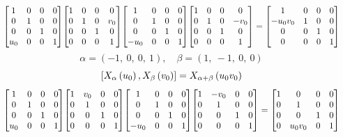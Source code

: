 \documentclass[11pt]{article}
\theoremstyle{definition}
\begin{document}
\[
\scaletoalign{\textwidth}{{\left[\begin{matrix}1 & 0 & 0 & 0\\0 & 1 & 0 & 0\\0 & 0 & 1 & 0\\u_{0} & 0 & 0 & 1\end{matrix}\right]} {\left[\begin{matrix}1 & 0 & 0 & 0\\0 & 1 & 0 & v_{0}\\0 & 0 & 1 & 0\\0 & 0 & 0 & 1\end{matrix}\right]} {\left[\begin{matrix}1 & 0 & 0 & 0\\0 & 1 & 0 & 0\\0 & 0 & 1 & 0\\- u_{0} & 0 & 0 & 1\end{matrix}\right]} {\left[\begin{matrix}1 & 0 & 0 & 0\\0 & 1 & 0 & - v_{0}\\0 & 0 & 1 & 0\\0 & 0 & 0 & 1\end{matrix}\right]} = {\left[\begin{matrix}1 & 0 & 0 & 0\\- u_{0} v_{0} & 1 & 0 & 0\\0 & 0 & 1 & 0\\0 & 0 & 0 & 1\end{matrix}\right]}}
\]
\[
\alpha = \left( -1, \  0, \  0, \  1\right), \quad \beta = \left( 1, \  -1, \  0, \  0\right)
\]
\[
\scaletoalign{\textwidth}{\left[ X_{\alpha}\left(u_{0}\right), X_{\beta}\left(v_{0}\right) \right] = X_{\alpha + \beta}\left(u_{0} v_{0}\right)}
\]
\[
\scaletoalign{\textwidth}{{\left[\begin{matrix}1 & 0 & 0 & 0\\0 & 1 & 0 & 0\\0 & 0 & 1 & 0\\u_{0} & 0 & 0 & 1\end{matrix}\right]} {\left[\begin{matrix}1 & v_{0} & 0 & 0\\0 & 1 & 0 & 0\\0 & 0 & 1 & 0\\0 & 0 & 0 & 1\end{matrix}\right]} {\left[\begin{matrix}1 & 0 & 0 & 0\\0 & 1 & 0 & 0\\0 & 0 & 1 & 0\\- u_{0} & 0 & 0 & 1\end{matrix}\right]} {\left[\begin{matrix}1 & - v_{0} & 0 & 0\\0 & 1 & 0 & 0\\0 & 0 & 1 & 0\\0 & 0 & 0 & 1\end{matrix}\right]} = {\left[\begin{matrix}1 & 0 & 0 & 0\\0 & 1 & 0 & 0\\0 & 0 & 1 & 0\\0 & u_{0} v_{0} & 0 & 1\end{matrix}\right]}}
\]
\end{document}
